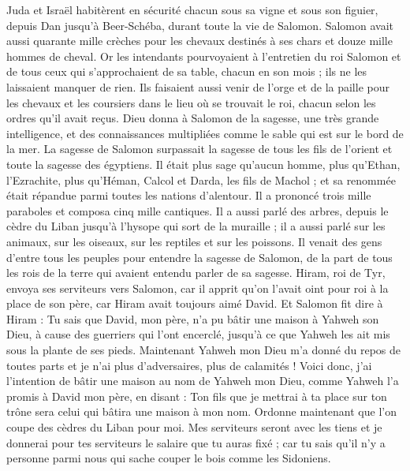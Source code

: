\begin{multicols}{2}
Juda et Israël habitèrent en sécurité chacun sous sa vigne et sous son figuier, depuis Dan jusqu'à Beer-Schéba, durant toute la vie de Salomon.
Salomon avait aussi quarante mille crèches pour les chevaux destinés à ses chars et douze mille hommes de cheval.
Or les intendants pourvoyaient à l'entretien du roi Salomon et de tous ceux qui s'approchaient de sa table, chacun en son mois ; ils ne les laissaient manquer de rien.
Ils faisaient aussi venir de l'orge et de la paille pour les chevaux et les coursiers dans le lieu où se trouvait le roi, chacun selon les ordres qu'il avait reçus.
Dieu donna à Salomon de la sagesse, une très grande intelligence, et des connaissances multipliées comme le sable qui est sur le bord de la mer.
La sagesse de Salomon surpassait la sagesse de tous les fils de l'orient et toute la sagesse des égyptiens.
Il était plus sage qu'aucun homme, plus qu'Ethan, l'Ezrachite, plus qu'Héman, Calcol et Darda, les fils de Machol ; et sa renommée était répandue parmi toutes les nations d'alentour.
Il a prononcé trois mille paraboles et composa cinq mille cantiques.
Il a aussi parlé des arbres, depuis le cèdre du Liban jusqu'à l'hysope qui sort de la muraille ; il a aussi parlé sur les animaux, sur les oiseaux, sur les reptiles et sur les poissons.
Il venait des gens d'entre tous les peuples pour entendre la sagesse de Salomon, de la part de tous les rois de la terre qui avaient entendu parler de sa sagesse.
\VerseOne{}Hiram, roi de Tyr, envoya ses serviteurs vers Salomon, car il apprit qu'on l'avait oint pour roi à la place de son père, car Hiram avait toujours aimé David.
Et Salomon fit dire à Hiram :
Tu sais que David, mon père, n'a pu bâtir une maison à Yahweh son Dieu, à cause des guerriers qui l'ont encerclé, jusqu'à ce que Yahweh les ait mis sous la plante de ses pieds.
Maintenant Yahweh mon Dieu m'a donné du repos de toutes parts et je n'ai plus d'adversaires, plus de calamités !
Voici donc, j'ai l'intention de bâtir une maison au nom de Yahweh mon Dieu, comme Yahweh l'a promis à David mon père, en disant : Ton fils que je mettrai à ta place sur ton trône sera celui qui bâtira une maison à mon nom.
Ordonne maintenant que l'on coupe des cèdres du Liban pour moi. Mes serviteurs seront avec les tiens et je donnerai pour tes serviteurs le salaire que tu auras fixé ; car tu sais qu'il n'y a personne parmi nous qui sache couper le bois comme les Sidoniens.

\end{multicols}
